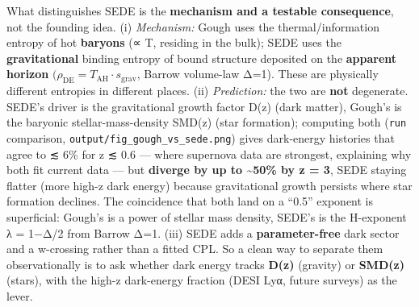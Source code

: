 \documentclass[
  10pt,
]{article}
\begin{document}
What distinguishes SEDE is the \textbf{mechanism and a testable
consequence}, not the founding idea. (i) \emph{Mechanism:} Gough uses
the thermal/information entropy of hot \textbf{baryons} (∝ T, residing
in the bulk); SEDE uses the \textbf{gravitational} binding entropy of
bound structure deposited on the \textbf{apparent horizon}
\((\rho _{\mathrm{DE}} = T_{\mathrm{AH}}\cdot s_{\mathrm{grav}}\),
Barrow volume-law Δ=1). These are physically different entropies in
different places. (ii) \emph{Prediction:} the two are \textbf{not}
degenerate. SEDE's driver is the gravitational growth factor D(z) (dark
matter), Gough's is the baryonic stellar-mass-density SMD(z) (star
formation); computing both (\texttt{run} comparison,
\texttt{output/fig\_gough\_vs\_sede.png}) gives dark-energy histories
that agree to ≲ 6\% for z ≲ 0.6 --- where supernova data are strongest,
explaining why both fit current data --- but \textbf{diverge by up to
\textasciitilde50\% by z = 3}, SEDE staying flatter (more high-z dark
energy) because gravitational growth persists where star formation
declines. The coincidence that both land on a ``0.5'' exponent is
superficial: Gough's is a power of stellar mass density, SEDE's is the
H-exponent λ = 1−Δ/2 from Barrow Δ=1. (iii) SEDE adds a
\textbf{parameter-free} dark sector and a w-crossing rather than a
fitted CPL. So a clean way to separate them observationally is to ask
whether dark energy tracks \textbf{D(z)} (gravity) or \textbf{SMD(z)}
(stars), with the high-z dark-energy fraction (DESI Lyα, future surveys)
as the lever.
\end{document}
